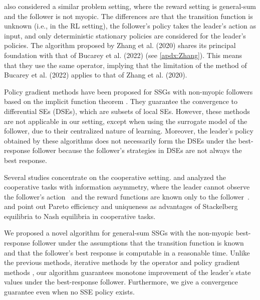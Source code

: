 \documentclass{acml}
\begin{document}
\citet{Zhang2020-hw} also considered a similar problem setting, where the reward setting is general-sum and the follower is not myopic.
The differences are that the transition function is unknown (i.e., in the RL setting), the follower's policy takes the leader's action as input, and only deterministic stationary policies are considered for the leader's policies.
The algorithm proposed by Zhang et al. (2020) shares its principal foundation with that of Bucarey et al. (2022) (see \cref{apdx:Zhang}).
This means that they use the same operator, implying that the limitation of the method of Bucarey et al. (2022) applies to that of Zhang et al. (2020).

Policy gradient methods have been proposed for SSGs with non-myopic followers \citep{Zheng2022-xj,vu2022stackelberg} based on the implicit function theorem \citep{Fiez2020-lu}.
They guarantee the convergence to differential SEs (DSEs), which are subsets of local SEs.
However, these methods are not applicable in our setting, except when using the surrogate model of the follower, due to their centralized nature of learning.
Moreover, the leader's policy obtained by these algorithms does not necessarily form the DSEs under the best-response follower because the follower's strategies in DSEs are not always the best response.

Several studies concentrate on the cooperative setting.
\citet{Kao2022-va} and \citet{Zhao2023-jc} analyzed the cooperative tasks with information asymmetry, where the leader cannot observe the follower's action~\citep{Kao2022-va} and the reward functions are known only to the follower~\citep{Zhao2023-jc}.
\citet{Kononen2004-xe} and \citet{Zhang2020-hw} point out Pareto efficiency and uniqueness as advantages of Stackelberg equilibria to Nash equilibria in cooperative tasks.

We proposed a novel algorithm for general-sum SSGs with the non-myopic best-response follower under the assumptions that the transition function is known and that the follower's best response is computable in a reasonable time.
Unlike the previous methods, iterative methods by the operator \citep{Bucarey2022-ro,Zhang2020-hw} and policy gradient methods \citep{Zheng2022-xj,vu2022stackelberg}, our algorithm guarantees monotone improvement of the leader's state values under the best-response follower.
Furthermore, we give a convergence guarantee even when no SSE policy exists. %
\end{document}
